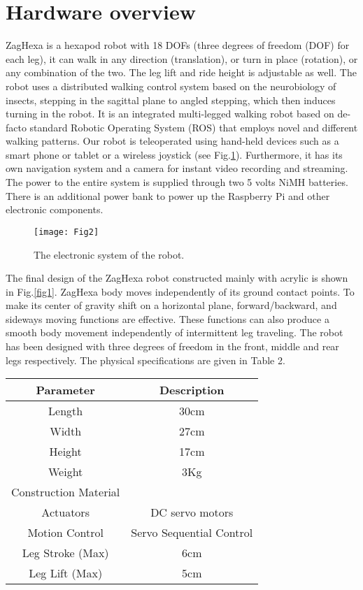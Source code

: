 \section{Hardware overview}
ZagHexa is a hexapod robot with 18 DOFs (three degrees of freedom (DOF) for each leg), it can walk in any direction (translation), or turn in place (rotation), or any combination of the two. The leg lift and ride height is adjustable as well. The robot uses a distributed walking control system based on the neurobiology of insects, stepping in the sagittal plane to angled stepping, which then induces turning in the robot.
It is an integrated multi-legged walking robot based on de-facto standard Robotic Operating System (ROS) that employs novel and different walking patterns.
Our robot is teleoperated using hand-held devices such as a smart phone or tablet or a wireless joystick (see Fig.\ref{fig4}). Furthermore, it has its own navigation system and a camera for instant video recording and streaming.
The power to the entire system is supplied through two 5 volts NiMH batteries. There is an additional power bank to power up the Raspberry Pi and other electronic components. 

\begin{figure}[h]
	\centering
	\texttt{[image: Fig2]}
	\caption{ The electronic system of the robot.}
	\label{fig4}
\end{figure}

The final design of the ZagHexa robot constructed mainly with acrylic is shown in Fig.\ref{fig1}. ZagHexa body moves independently of its ground contact points. To make its center of gravity shift on a horizontal plane, forward/backward, and sideways moving functions are effective. These functions can also produce a smooth body movement independently of intermittent leg traveling. The robot has been designed with three degrees of freedom in the front, middle and rear legs respectively. The physical specifications are given in Table 2.\\

\begin{center}
\begin{tabular}{|c|c|}
    \hline
    Parameter       &       Description        \\ \hline
    Length         &           30cm           \\ \hline
    Width         &           27cm           \\ \hline
    Height         &           17cm           \\ \hline
    Weight         &           3Kg            \\ \hline
    Construction Material &                          \\ \hline
    Actuators       &     DC servo motors      \\ \hline
    Motion Control     & Servo Sequential Control \\ \hline
    Leg Stroke (Max)    &           6cm            \\ \hline
    Leg Lift (Max)     &           5cm            \\ \hline
\end{tabular}
\end{center}

